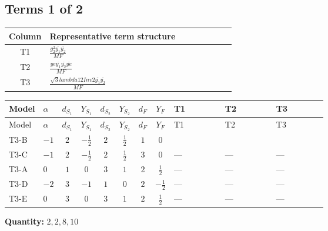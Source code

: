 \documentclass[8pt]{article}
\begin{document}
\begin{landscape}
\subsection*{Terms 1 of 2}
\begin{center}
\begin{tabular}{@{}c >{\raggedright\arraybackslash}p{0.82\linewidth}@{}}
\toprule
Column & Representative term structure \\
\midrule
T1 & \(\displaystyle \frac{g_{2}^{2} \overline{y_{1}} \overline{y_{2}}}{MF}\) \\
\midrule
T2 & \(\displaystyle \frac{ye \overline{y_{1}} \overline{y_{2}} \overline{ye}}{MF}\) \\
\midrule
T3 & \(\displaystyle \frac{\sqrt{3} lambda12Inv2 \overline{y_{1}} \overline{y_{2}}}{MF}\) \\
\midrule
\bottomrule
\end{tabular}
\end{center}
\smallskip
\tiny
\begin{longtable}{@{}llcccccc >{\raggedright\arraybackslash}p{0.21\linewidth} >{\raggedright\arraybackslash}p{0.21\linewidth} >{\raggedright\arraybackslash}p{0.21\linewidth}@{}}
\toprule
Model & $\alpha$ & $d_{S_1}$ & $Y_{S_1}$ & $d_{S_2}$ & $Y_{S_2}$ & $d_F$ & $Y_F$ & T1 & T2 & T3 \\
\midrule
\endfirsthead
\toprule
Model & $\alpha$ & $d_{S_1}$ & $Y_{S_1}$ & $d_{S_2}$ & $Y_{S_2}$ & $d_F$ & $Y_F$ & T1 & T2 & T3 \\
\midrule
\endhead
T3-B & $-1$ & $2$ & $-\frac{1}{2}$ & $2$ & $\frac{1}{2}$ & $1$ & $0$ & \scriptsize\adjustbox{max width=\linewidth}{$\begin{gathered} \frac{3 g_{2}^{2} \overline{y_{1}} \overline{y_{2}}}{4 MF}\end{gathered}$} & \scriptsize\adjustbox{max width=\linewidth}{$\begin{gathered} - \frac{ye \overline{y_{1}} \overline{y_{2}} \overline{ye}}{4 MF}\end{gathered}$} & \scriptsize\adjustbox{max width=\linewidth}{$\begin{gathered} \frac{\sqrt{3} lambda12Inv2 \overline{y_{1}} \overline{y_{2}}}{3 MF}\end{gathered}$} \\
\midrule
T3-C & $-1$ & $2$ & $-\frac{1}{2}$ & $2$ & $\frac{1}{2}$ & $3$ & $0$ & --- & --- & --- \\
\midrule
T3-A & $0$ & $1$ & $0$ & $3$ & $1$ & $2$ & $\frac{1}{2}$ & --- & --- & --- \\
\midrule
T3-D & $-2$ & $3$ & $-1$ & $1$ & $0$ & $2$ & $-\frac{1}{2}$ & --- & --- & --- \\
\midrule
T3-E & $0$ & $3$ & $0$ & $3$ & $1$ & $2$ & $\frac{1}{2}$ & --- & --- & --- \\
\midrule
\bottomrule
\end{longtable}
\clearpage
\noindent\textbf{Quantity: }$\mathrm{2,2,8,10}$\par\smallskip

\end{landscape}
\end{document}
